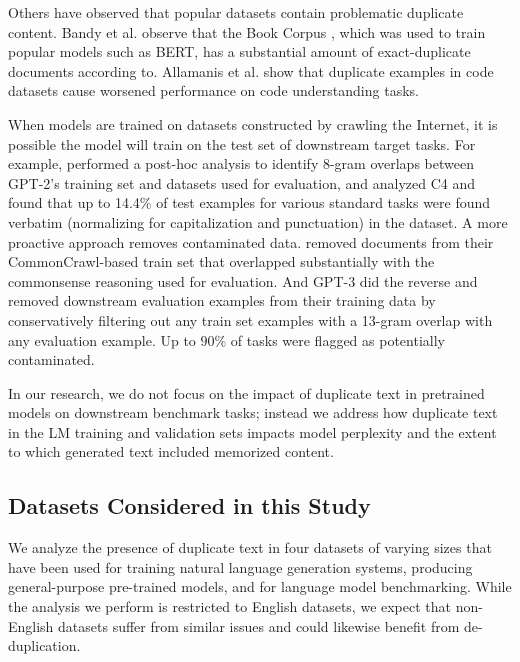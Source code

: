 Others have observed that popular datasets contain problematic duplicate content.
Bandy et al. \citep{bandy2021addressing} observe that the  Book Corpus \citep{zhu2015aligning}, which was used to train popular models such as BERT, has a substantial amount of exact-duplicate documents according to.
Allamanis et al. \citet{allamanis2019adverse} show that duplicate examples in code datasets cause worsened performance on code understanding tasks.

When models are trained on datasets constructed by crawling the Internet, it is possible the model will train on the test set of downstream target tasks.
For example, \citet[\S{}4]{radford2019language} performed a post-hoc analysis to identify 8-gram overlaps between GPT-2's training set and datasets used for evaluation,
and \citet{Dodge2021-lb} analyzed C4 and found that up to 14.4\%  of test examples for various standard tasks were found verbatim (normalizing for capitalization and punctuation) in the dataset.
A more proactive approach removes contaminated data.
\citet[Appendix B]{trinh2018simple} removed documents from their CommonCrawl-based train set that overlapped substantially with the commonsense reasoning used for evaluation.
And GPT-3 \cite[\S{}5]{brown2020language} did the reverse and removed downstream evaluation examples from their training data by conservatively filtering out any train set examples with a 13-gram overlap with any evaluation example.
Up to $90\%$ of tasks were flagged as potentially contaminated.

In our research, we do not focus on the impact of duplicate text in pretrained models on downstream benchmark tasks; instead we address how duplicate text in the LM training and validation sets impacts model perplexity and the extent to which generated text included memorized content.


\subsection{Datasets Considered in this Study}
We analyze the presence of duplicate text in four datasets of varying sizes that have been used for training natural language generation systems, producing general-purpose pre-trained models, and for language model benchmarking.
While the analysis we perform is restricted to English datasets, we expect that non-English datasets suffer from similar issues and could likewise benefit from de-duplication.

